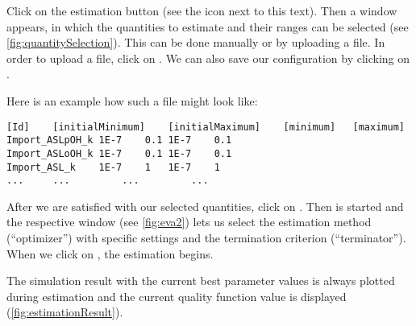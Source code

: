 Click on the estimation button (see the icon next to this text).
Then a window appears, in which the quantities to estimate and their ranges can be selected (see  \cref{fig:quantitySelection}).
This can be done manually or by uploading a \CSV file.
In order to upload a file, click on .
We can also save our configuration by clicking on .

 Here is an example how such a file might look like:
\begin{lstlisting}[caption={Input file example for parameter estimation file},label={lst:input:estimation},numbers=none,captionpos=t,float=h]
[Id]	[initialMinimum]	[initialMaximum]	[minimum]	[maximum]
Import_ASLpOH_k	1E-7	0.1	1E-7	0.1	
Import_ASLoOH_k	1E-7	0.1	1E-7	0.1	
Import_ASL_k	1E-7	1	1E-7	1	
...     ...         ...         ...
\end{lstlisting}

After we are satisfied with our selected quantities, click on .
Then \EvA is started and the respective window (see \cref{fig:eva2}) lets us select the estimation method (``optimizer'') with specific settings   and the termination criterion (``terminator'').
When we click on , the estimation begins. 

The simulation result with the current best parameter values is always plotted during estimation and the current quality function value is displayed (\cref{fig:estimationResult}).

